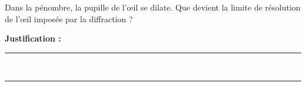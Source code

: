 Dans la pénombre, la pupille de l'œil se dilate. Que devient la limite de résolution de l'œil imposée par la diffraction ?

\choices

\noindent\textbf{Justification :} \hrulefill \\[2.5ex]
\rule{\linewidth}{0.4pt} \\[2.5ex]
\rule{\linewidth}{0.4pt}
\vfill
